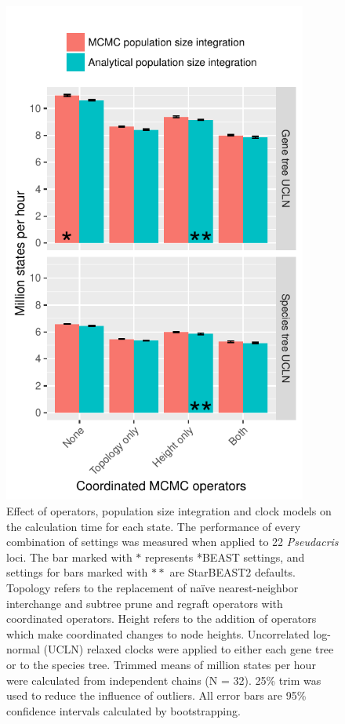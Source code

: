 \documentclass[12pt]{article}
\begin{document}
\clearpage

\begin{figure}[htb!]
\centering
\includegraphics[width=10cm]{mstates_rates.pdf}
\caption
{Effect of operators, population size integration and clock models on the
calculation time for each state. The performance of every combination of
settings was measured when applied to 22 \textit{Pseudacris} loci. The bar
marked with $\ast$ represents *BEAST settings, and settings for bars marked with
$\ast\ast$ are StarBEAST2 defaults. Topology refers to the replacement of
na\"ive nearest-neighbor interchange and subtree prune and regraft operators
with coordinated operators. Height refers to the addition of operators which
make coordinated changes to node heights. Uncorrelated log-normal (UCLN) relaxed
clocks were applied to either each gene tree or to the species tree. Trimmed
means of million states per hour were calculated from independent chains (N =
32). 25\% trim was used to reduce the influence of outliers. All error bars are
95\% confidence intervals calculated by bootstrapping.}
\label{fig:mstatesPerHour}
\end{figure}
\end{document}
